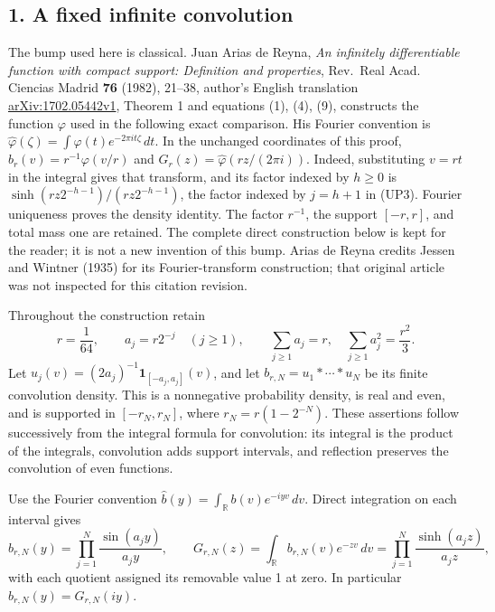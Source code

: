 \documentclass[
  10pt,
  a4paper,
]{article}
\begin{document}
\subsection{1. A fixed infinite
convolution}\label{a-fixed-infinite-convolution}

The bump used here is classical. Juan Arias de Reyna, \emph{An
infinitely differentiable function with compact support: Definition and
properties}, Rev.~Real Acad. Ciencias Madrid \textbf{76} (1982), 21--38,
author's English translation
\href{https://arxiv.org/abs/1702.05442v1}{arXiv:1702.05442v1}, Theorem 1
and equations (1), (4), (9), constructs the function \(\varphi\) used in
the following exact comparison. His Fourier convention is
\(\widehat\varphi(\zeta)=\int\varphi(t)e^{-2\pi i t\zeta}\,dt\). In the
unchanged coordinates of this proof, \(b_r(v)=r^{-1}\varphi(v/r)\) and
\(G_r(z)=\widehat\varphi(rz/(2\pi i))\). Indeed, substituting \(v=rt\)
in the integral gives that transform, and its factor indexed by
\(h\ge0\) is \(\sinh(rz2^{-h-1})/(rz2^{-h-1})\), the factor indexed by
\(j=h+1\) in (UP3). Fourier uniqueness proves the density identity. The
factor \(r^{-1}\), the support \([-r,r]\), and total mass one are
retained. The complete direct construction below is kept for the reader;
it is not a new invention of this bump. Arias de Reyna credits Jessen
and Wintner (1935) for its Fourier-transform construction; that original
article was not inspected for this citation revision.

Throughout the construction retain \[
r=\frac1{64},\qquad a_j=r2^{-j}\quad(j\ge1),\qquad
\sum_{j\ge1}a_j=r,\quad \sum_{j\ge1}a_j^2=\frac{r^2}{3}.
\tag{UP1}
\] Let \(u_j(v)=(2a_j)^{-1}\mathbf1_{[-a_j,a_j]}(v)\), and let
\(b_{r,N}=u_1*\cdots*u_N\) be its finite convolution density. This is a
nonnegative probability density, is real and even, and is supported in
\([-r_N,r_N]\), where \(r_N=r(1-2^{-N})\). These assertions follow
successively from the integral formula for convolution: its integral is
the product of the integrals, convolution adds support intervals, and
reflection preserves the convolution of even functions.

Use the Fourier convention
\(\widehat b(y)=\int_{\mathbb R}b(v)e^{-iyv}\,dv\). Direct integration
on each interval gives \[
\widehat b_{r,N}(y)=\prod_{j=1}^N\frac{\sin(a_jy)}{a_jy},\qquad
G_{r,N}(z)=\int_{\mathbb R}b_{r,N}(v)e^{-zv}\,dv
=\prod_{j=1}^N\frac{\sinh(a_jz)}{a_jz},
\tag{UP2}
\] with each quotient assigned its removable value 1 at zero. In
particular \(\widehat b_{r,N}(y)=G_{r,N}(iy)\).
\end{document}
